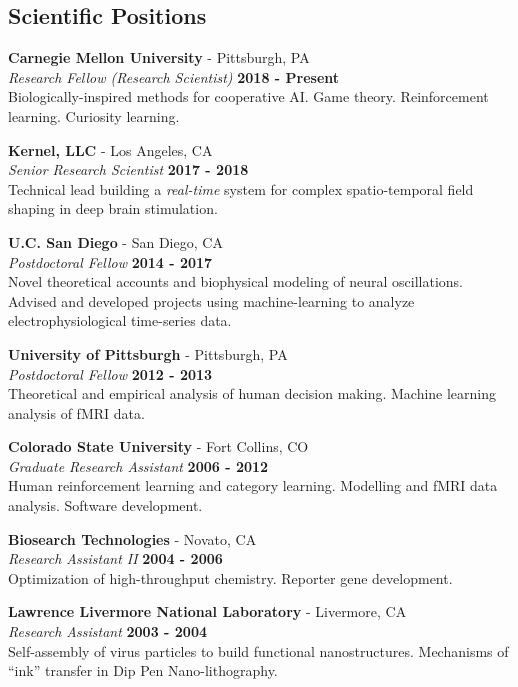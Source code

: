 \documentclass[margin,line]{res}
\begin{document}
\begin{resume}
\section{\sc Scientific Positions}

{\bf Carnegie Mellon University} - Pittsburgh, PA \\
{\em Research Fellow (Research Scientist)} \hfill {\bf 2018 - Present}\\
Biologically-inspired methods for cooperative AI. Game theory. Reinforcement learning. Curiosity learning. 

{\bf Kernel, LLC} - Los Angeles, CA\\
{\em Senior Research Scientist} \hfill {\bf 2017 - 2018}\\
Technical lead building a \emph{real-time} system for complex spatio-temporal field shaping in deep brain stimulation.

{\bf U.C. San Diego} - San Diego, CA\\
{\em Postdoctoral Fellow} \hfill {\bf 2014 - 2017}\\
Novel theoretical accounts and biophysical modeling of neural oscillations. Advised and developed projects using machine-learning to analyze electrophysiological time-series data.

{\bf University of Pittsburgh} - Pittsburgh, PA\\
{\em Postdoctoral Fellow} \hfill {\bf 2012 - 2013}\\
Theoretical and empirical analysis of human decision making. Machine learning analysis of fMRI data.

{\bf Colorado State University} - Fort Collins, CO\\
{\em Graduate Research Assistant} \hfill {\bf 2006 - 2012}\\
Human reinforcement learning and category learning. Modelling and fMRI data analysis. Software development.

{\bf Biosearch Technologies} - Novato, CA\\
{\em Research Assistant II} \hfill {\bf 2004 - 2006}\\
Optimization of high-throughput chemistry. Reporter gene development.

{\bf Lawrence Livermore National Laboratory} - Livermore, CA\\
{\em Research Assistant} \hfill {\bf 2003 - 2004}\\
Self-assembly of virus particles to build functional nanostructures. Mechanisms of ``ink'' transfer in Dip Pen Nano-lithography.



\end{resume}
\end{document}
